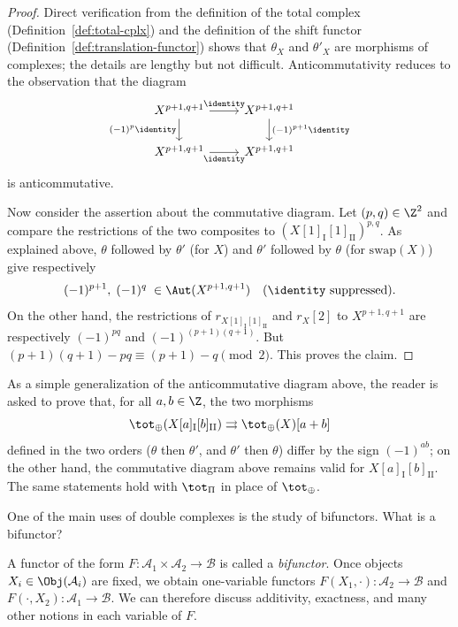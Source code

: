 \begin{proof}
	Direct verification from the definition of the total complex
	(Definition~\ref{def:total-cplx}) and the definition of the shift functor
	(Definition~\ref{def:translation-functor}) shows that $\theta_X$ and
	$\theta'_X$ are morphisms of complexes; the details are lengthy but not
	difficult. Anticommutativity reduces to the observation that the diagram
	\[\begin{tikzcd}
		X^{p+1, q+1} \arrow[d, "{(-1)^p \identity}"'] \arrow[r, "\identity"] & X^{p+1, q+1} \arrow[d, "{(-1)^{p+1} \identity}"] \\
		X^{p+1, q+1} \arrow[r, "\identity"'] & X^{p+1, q+1}
	\end{tikzcd}\]
	is anticommutative.

	Now consider the assertion about the commutative diagram. Let
	$(p,q)\in\Z^2$ and compare the restrictions of the two composites to
	$(X[1]_{\mathrm{I}}[1]_{\mathrm{II}})^{p,q}$. As explained above,
	$\theta$ followed by $\theta'$ (for $X$) and $\theta'$ followed by
	$\theta$ (for $\mathrm{swap}(X)$) give respectively
	\[ (-1)^{p+1}, \; (-1)^q \; \in \Aut(X^{p+1, q+1}) \quad \text{($\identity$ suppressed)}. \]
	On the other hand, the restrictions of
	$r_{X[1]_{\mathrm{I}}[1]_{\mathrm{II}}}$ and $r_X[2]$ to
	$X^{p+1,q+1}$ are respectively $(-1)^{pq}$ and
	$(-1)^{(p+1)(q+1)}$. But
	$(p+1)(q+1)-pq\equiv(p+1)-q\pmod{2}$. This proves the claim.
\end{proof}

As a simple generalization of the anticommutative diagram above, the reader is
asked to prove that, for all $a,b\in\Z$, the two morphisms
\[ \tot_{\oplus}(X[a]_{\mathrm{I}}[b]_{\mathrm{II}}) \rightrightarrows \tot_{\oplus}(X)[a+b] \]
defined in the two orders ($\theta$ then $\theta'$, and $\theta'$ then
$\theta$) differ by the sign $(-1)^{ab}$; on the other hand, the commutative
diagram above remains valid for $X[a]_{\mathrm{I}}[b]_{\mathrm{II}}$. The
same statements hold with $\tot_{\Pi}$ in place of $\tot_{\oplus}$.

One of the main uses of double complexes is the study of bifunctors. What is a
bifunctor?

\begin{convention}\label{con:bifunctor}
	A functor of the form $F:\mathcal{A}_1\times\mathcal{A}_2\to\mathcal{B}$
	is called a \emph{bifunctor}. Once objects
	$X_i\in\Obj(\mathcal{A}_i)$ are fixed, we obtain one-variable functors
	$F(X_1,\cdot):\mathcal{A}_2\to\mathcal{B}$ and
	$F(\cdot,X_2):\mathcal{A}_1\to\mathcal{B}$. We can therefore discuss
	additivity, exactness, and many other notions in each variable of $F$.
\end{convention}

